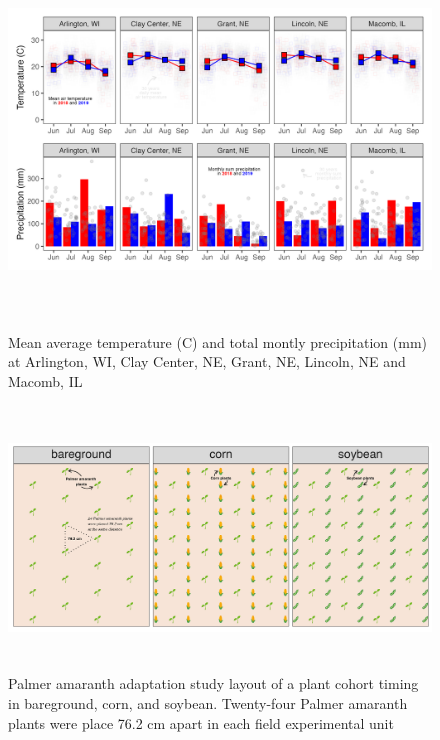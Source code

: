 \documentclass[utf8]{frontiersSCNS}
\begin{document}
\begin{figure}

{\centering \includegraphics[width=160mm,height=100mm]{../data analysis/weather/Figure 1} 

}

\caption{Mean average temperature (C) and total montly precipitation (mm) at Arlington, WI, Clay Center, NE, Grant, NE, Lincoln, NE and Macomb, IL}\label{fig:Figure-1}
\end{figure}

\begin{figure}

{\centering \includegraphics[width=150mm,height=70mm]{../data analysis/figures/Figure 2} 

}

\caption{Palmer amaranth adaptation study layout of a plant cohort timing in bareground, corn, and soybean. Twenty-four Palmer amaranth plants were place 76.2 cm apart in each field experimental unit}\label{fig:Figure-2}
\end{figure}
\end{document}
